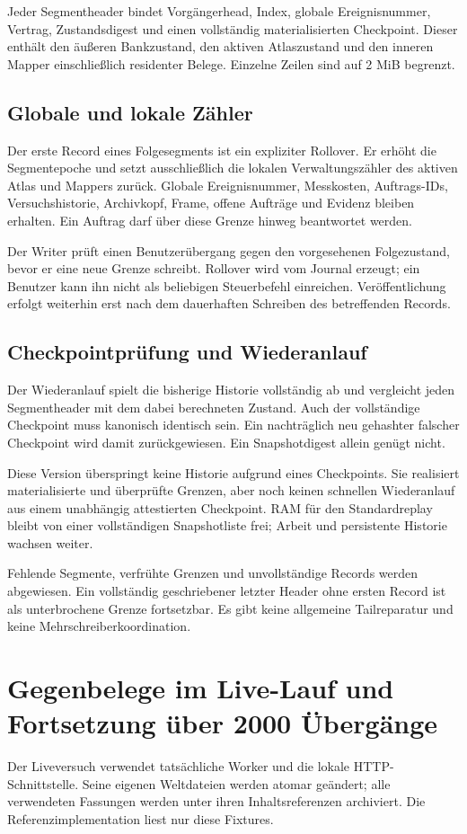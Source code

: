 \documentclass[11pt,a4paper]{article}
\newcommand{\nextsection}[2]{\clearpage{\color{accent}\small\textsf{#1}}\section{#2}}
\begin{document}
Jeder Segmentheader bindet Vorgängerhead, Index, globale Ereignisnummer,
Vertrag, Zustandsdigest und einen vollständig materialisierten
Checkpoint. Dieser enthält den äußeren Bankzustand, den aktiven
Atlaszustand und den inneren Mapper einschließlich residenter Belege.
Einzelne Zeilen sind auf 2 MiB begrenzt.

\subsection{Globale und lokale Zähler}
Der erste Record eines Folgesegments ist ein expliziter Rollover.
Er erhöht die Segmentepoche und setzt ausschließlich die lokalen
Verwaltungszähler des aktiven Atlas und Mappers zurück. Globale
Ereignisnummer, Messkosten, Auftrags-IDs, Versuchshistorie,
Archivkopf, Frame, offene Aufträge und Evidenz bleiben erhalten.
Ein Auftrag darf über diese Grenze hinweg beantwortet werden.

Der Writer prüft einen Benutzerübergang gegen den vorgesehenen
Folgezustand, bevor er eine neue Grenze schreibt. Rollover wird vom
Journal erzeugt; ein Benutzer kann ihn nicht als beliebigen
Steuerbefehl einreichen. Veröffentlichung erfolgt weiterhin erst
nach dem dauerhaften Schreiben des betreffenden Records.

\subsection{Checkpointprüfung und Wiederanlauf}
Der Wiederanlauf spielt die bisherige Historie vollständig ab und
vergleicht jeden Segmentheader mit dem dabei berechneten Zustand.
Auch der vollständige Checkpoint muss kanonisch identisch sein.
Ein nachträglich neu gehashter falscher Checkpoint wird damit
zurückgewiesen. Ein Snapshotdigest allein genügt nicht.

Diese Version überspringt keine Historie aufgrund eines Checkpoints.
Sie realisiert materialisierte und überprüfte Grenzen, aber noch
keinen schnellen Wiederanlauf aus einem unabhängig attestierten
Checkpoint. RAM für den Standardreplay bleibt von einer vollständigen
Snapshotliste frei; Arbeit und persistente Historie wachsen weiter.

Fehlende Segmente, verfrühte Grenzen und unvollständige Records werden
abgewiesen. Ein vollständig geschriebener letzter Header ohne ersten
Record ist als unterbrochene Grenze fortsetzbar. Es gibt keine
allgemeine Tailreparatur und keine Mehrschreiberkoordination.

\nextsection{45 / REGISTRIERTER NACHWEIS}{Gegenbelege im Live-Lauf und Fortsetzung über 2000 Übergänge}
Der Liveversuch verwendet tatsächliche Worker und die lokale
HTTP-Schnittstelle. Seine eigenen Weltdateien werden atomar geändert;
alle verwendeten Fassungen werden unter ihren Inhaltsreferenzen
archiviert. Die Referenzimplementation liest nur diese Fixtures.
\end{document}
